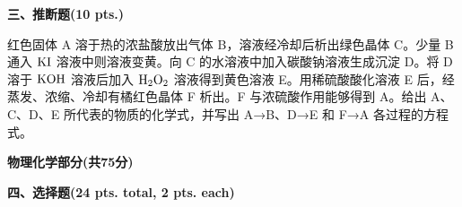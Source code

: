 \vspace{1em}
\noindent\textbf{三、推断题(10 pts.)}

红色固体 A 溶于热的浓盐酸放出气体 B，溶液经冷却后析出绿色晶体 C。少量 B 通入 $\ce{KI}$ 溶液中则溶液变黄。向 C 的水溶液中加入碳酸钠溶液生成沉淀 D。将 D 溶于 $\ce{KOH}$ 溶液后加入 $\ce{H2O2}$ 溶液得到黄色溶液 E。用稀硫酸酸化溶液 E 后，经蒸发、浓缩、冷却有橘红色晶体 F 析出。F 与浓硫酸作用能够得到 A。给出 A、C、D、E 所代表的物质的化学式，并写出 A→B、D→E 和 F→A 各过程的方程式。

\vspace{0.5cm}
\begin{center}
    {\Large \textbf{物理化学部分(共75分)}}
\end{center}

\vspace{0.5cm}
\noindent\textbf{四、选择题(24 pts. total, 2 pts. each)}

